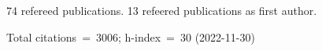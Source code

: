 74 refereed publications. 13 refeered publications as first author.

Total citations~=~3006; h-index~=~30 (2022-11-30)